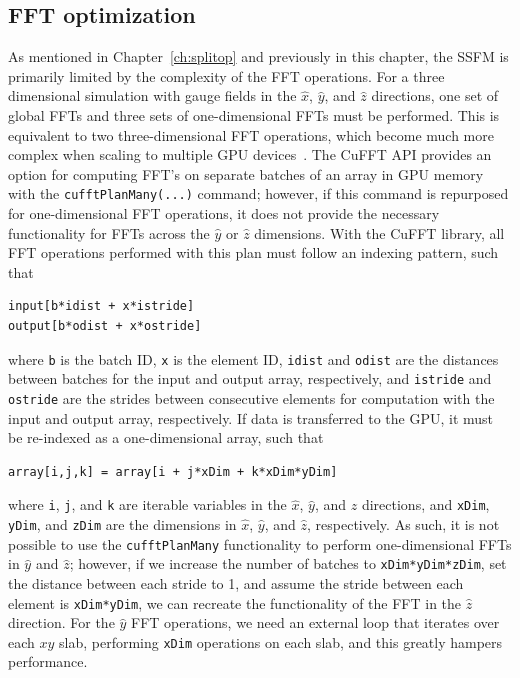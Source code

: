 \subsection{FFT optimization}

As mentioned in Chapter~\ref{ch:splitop} and previously in this chapter, the SSFM is primarily limited by the complexity of the FFT operations.
For a three dimensional simulation with gauge fields in the $\hat x$, $\hat y$, and $\hat z$ directions, one set of global FFTs and three sets of one-dimensional FFTs must be performed.
This is equivalent to two three-dimensional FFT operations, which become much more complex when scaling to multiple GPU devices~\cite{czechowski2012}.
The CuFFT API provides an option for computing FFT's on separate batches of an array in GPU memory with the \texttt{cufftPlanMany(...)} command; however, if this command is repurposed for one-dimensional FFT operations, it does not provide the necessary functionality for FFTs across the $\hat y$ or $\hat z$ dimensions.
With the CuFFT library, all FFT operations performed with this plan must follow an indexing pattern, such that 

\begin{lstlisting}
input[b*idist + x*istride]
output[b*odist + x*ostride]
\end{lstlisting}

\noindent where \texttt{b} is the batch ID, \texttt{x} is the element ID, \texttt{idist} and \texttt{odist} are the distances between batches for the input and output array, respectively, and \texttt{istride} and \texttt{ostride} are the strides between consecutive elements for computation with the input and output array, respectively.
If data is transferred to the GPU, it must be re-indexed as a one-dimensional array, such that

\begin{lstlisting}
array[i,j,k] = array[i + j*xDim + k*xDim*yDim]
\end{lstlisting}

\noindent where \texttt{i}, \texttt{j}, and \texttt{k} are iterable variables in the $\hat x$, $\hat y$, and $\hat z$ directions, and \texttt{xDim}, \texttt{yDim}, and \texttt{zDim} are the dimensions in $\hat x$, $\hat y$, and $\hat z$, respectively.
As such, it is not possible to use the \texttt{cufftPlanMany} functionality to perform one-dimensional FFTs in $\hat y$ and $\hat z$; however, if we increase the number of batches to \texttt{xDim*yDim*zDim}, set the distance between each stride to 1, and assume the stride between each element is \texttt{xDim*yDim}, we can recreate the functionality of the FFT in the $\hat z$ direction.
For the $\hat y$ FFT operations, we need an external loop that iterates over each $xy$ slab, performing \texttt{xDim} operations on each slab, and this greatly hampers performance.

